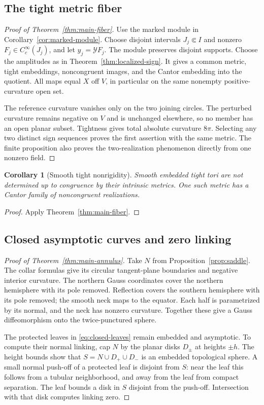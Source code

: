 \documentclass[11pt]{amsart}
\newtheorem{corollary}[theorem]{Corollary}
\theoremstyle{definition}
\theoremstyle{remark}
\numberwithin{equation}{section}
\begin{document}
\subsection{The tight metric fiber}\label{sec:tight-main}
\begin{proof}[Proof of Theorem~\ref{thm:main-fiber}]
Use the marked module in Corollary~\ref{cor:marked-module}. Choose disjoint
intervals $J_j\Subset I$ and nonzero $F_j\in C_c^\infty(J_j)$, and let
$y_j=\mathcal YF_j$. The module preserves disjoint supports. Choose the
amplitudes as in Theorem~\ref{thm:localized-sign}. It gives a common metric,
tight embeddings, noncongruent images, and the Cantor embedding into the
quotient. All maps equal $X$ off $V$, in particular on the same nonempty
positive-curvature open set.

The reference curvature vanishes only on the two joining circles.
The perturbed curvature remains negative on $V$ and is unchanged elsewhere,
so no member has an open planar subset. Tightness gives total absolute
curvature $8\pi$. Selecting any two distinct sign sequences proves the
first assertion with the same metric. The finite proposition also proves
the two-realization phenomenon directly from one nonzero field.
\end{proof}

\begin{corollary}[Smooth tight nonrigidity]\label{cor:tight-nonrigidity}
Smooth embedded tight tori are not determined up to congruence by their
intrinsic metrics. One such metric has a Cantor family of noncongruent
realizations.
\end{corollary}
\begin{proof}
Apply Theorem~\ref{thm:main-fiber}.
\end{proof}

\subsection{Closed asymptotic curves and zero linking}
\begin{proof}[Proof of Theorem~\ref{thm:main-annulus}]
Take $N$ from Proposition~\ref{prop:saddle}. The collar formulas give
its circular tangent-plane boundaries and negative interior curvature.
The northern Gauss coordinates cover the northern hemisphere with its
pole removed. Reflection covers the southern hemisphere with its pole
removed; the smooth neck maps to the equator. Each half is parametrized
by its normal, and the neck has nonzero curvature. Together these give
a Gauss diffeomorphism onto the twice-punctured sphere.

The protected leaves in \eqref{eq:closed-leaves} remain embedded and
asymptotic. To compute their normal linking, cap $N$ by the planar disks
$D_\pm$ at heights $\pm h$. The height bounds show that
$S=N\cup D_+\cup D_-$ is an embedded topological sphere.
A small normal push-off of a protected leaf is disjoint from $S$:
near the leaf this follows from a tubular neighborhood, and away from
the leaf from compact separation. The leaf bounds a disk in $S$ disjoint
from the push-off. Intersection with that disk computes linking zero.
\end{proof}
\end{document}
